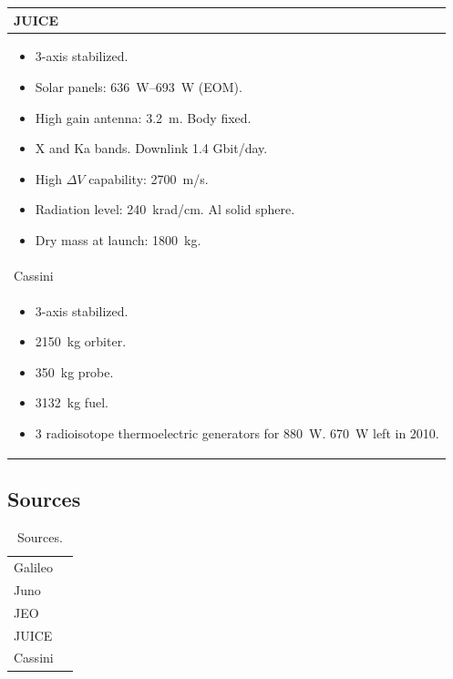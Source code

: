 \begin{longtable}{p{}}
  JUICE \\* \midrule

  \begin{itemize}
  \item 3-axis stabilized.
  \item Solar panels: \SI{636}{W}--\SI{693}{W} (EOM).
  \item High gain antenna: \SI{3.2}{m}. Body fixed.
  \item X and Ka bands. Downlink 1.4 Gbit/day.
  \item High $\Delta V$ capability: \SI{2700}{m/s}.
  \item Radiation level: \SI{240}{krad/cm}. Al solid sphere.
  \item Dry mass at launch: \SI{1800}{kg}.
  \end{itemize} \\ \pagebreak

  Cassini \\* \midrule

  \begin{itemize}
  \item 3-axis stabilized.
  \item \SI{2150}{kg} orbiter.
  \item \SI{350}{kg} probe.
  \item \SI{3132}{kg} fuel.
  \item 3 radioisotope thermoelectric generators for
    \SI{880}{W}. \SI{670}{W} left in 2010.
  \end{itemize} \\
\end{longtable}

\subsection{Sources}

\begin{longtable}{ll}
  \caption{Sources.} \\

  Galileo & \cite{nasagalileo,jplgalileo} \\

  Juno & \cite{nasajuno} \\

  JEO & \cite{nasajeo} \\

  JUICE & \cite{esajuice} \\

  Cassini & \cite{nasacassini} \\
\end{longtable}

